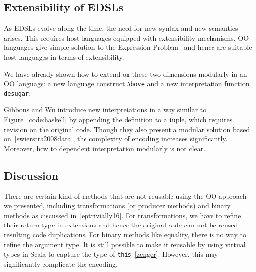\subsection{Extensibility of EDSLs}
As EDSLs evolve along the time, the need for new syntax and new semantics arises.
This requires host languages equipped with extensibility mechanisms.
OO languages give simple solution to the Expression Problem~\cite{eptrivially16}
and hence are suitable host languages in terms of extensibility.

We have already shown how to extend \dsl on these two dimensions modularly in an
OO language: a new language construct \lstinline{Above} and a new interpretation function \lstinline{desugar}.

Gibbons and Wu introduce new interpretations in a way similar to
Figure~\ref{code:haskell} by appending the definition to a tuple,
which requires revision on the original code.
Though they also present a modular solution based on~\ref{swierstra2008data},
the complexity of encoding increases significantly. Moreover, how to dependent
interpretation modularly is not clear.

\subsection{Discussion}
There are certain kind of methods that are not reusable using the OO approach we
presented, including transformations (or producer methods) and binary
methods as discussed in~\ref{eptrivially16}.
For transformations, we have to refine their return type in extensions and hence
the original code can not be reused, resulting code duplications.
For binary methods like equality, there is no way to refine the argument type.
It is still possible to make it reusable by using virtual types in Scala to capture the type of \lstinline{this}~\ref{zenger}.
However, this may significantly complicate the encoding.
